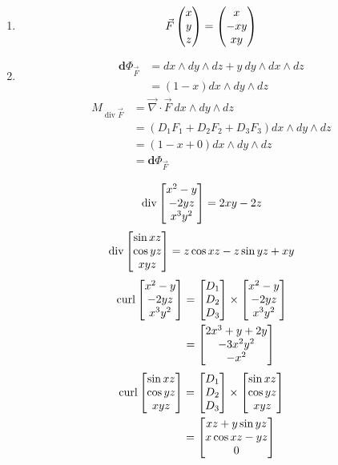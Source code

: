 \documentclass{homework}
\DeclareMathOperator{\curl}{curl}
\DeclareMathOperator{\rediv}{div}
\renewcommand\div{\rediv}
\begin{document}
\begin{problem}{7}
  \begin{enumerate}
    \item
      $$\vec{F}\begin{pmatrix}x \\ y \\ z\end{pmatrix} = \begin{pmatrix}x \\ -xy \\ xy\end{pmatrix}$$
    \item
      \newcommand \ED{\mathbf{d}}
      \begin{align*}
        \ED \Phi_{\vec{F}} &= dx \land dy \land dz + y\ dy \land dx \land dz \\
                           &= (1-x) dx \land dy \land dz
      \end{align*}
      \begin{align*}
        M_{\div\vec{F}} &=
        \vec{\nabla} \cdot \vec{F}\ dx \land dy \land dz \\ &=
        (D_1F_1 + D_2F_2 + D_3F_3) dx \land dy \land dz \\ &=
        (1 - x + 0) dx \land dy \land dz \\ &= \ED \Phi_{\vec{F}}
      \end{align*}
  \end{enumerate}
\end{problem}

\begin{problem}{8}
  \begin{align*}
    \div \bmat{x^2-y \\ -2yz \\ x^3y^2} = 2xy - 2z
  \end{align*}
  \begin{align*}
    \div \bmat{\sin{xz} \\ \cos{yz} \\ xyz} = z\cos{xz}-z\sin{yz}+xy
  \end{align*}
  \begin{align*}
    \curl \bmat{x^2-y \\ -2yz \\ x^3y^2} &=
    \bmat{D_1 \\ D_2 \\ D_3} \times \bmat{x^2-y \\ -2yz \\ x^3y^2} \\ &=
    \bmat{2x^3+y+2y \\ -3x^2y^2 \\ -x^2}
  \end{align*}
  \begin{align*}
    \curl \bmat{\sin{xz} \\ \cos{yz} \\ xyz} &=
    \bmat{D_1 \\ D_2 \\ D_3} \times \bmat{\sin{xz} \\ \cos{yz} \\ xyz} \\ &=
    \bmat{xz + y\sin{yz} \\ x\cos{xz} - yz \\0}
  \end{align*}

\end{problem}
\end{document}
